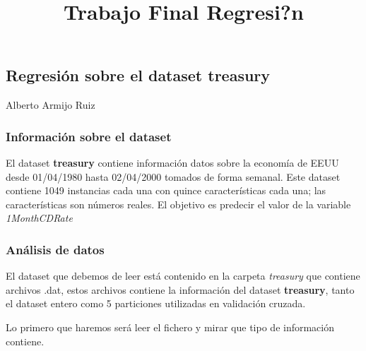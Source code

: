 \documentclass[11pt]{article}
\title{Trabajo Final Regresi?n}
\begin{document}
    
    
    \maketitle
    
    

    
    \hypertarget{regresiuxf3n-sobre-el-dataset-treasury}{%
\subsection{Regresión sobre el dataset
treasury}\label{regresiuxf3n-sobre-el-dataset-treasury}}

Alberto Armijo Ruiz

    \hypertarget{informaciuxf3n-sobre-el-dataset}{%
\subsubsection{Información sobre el
dataset}\label{informaciuxf3n-sobre-el-dataset}}

El dataset \textbf{treasury} contiene información datos sobre la
economía de EEUU desde 01/04/1980 hasta 02/04/2000 tomados de forma
semanal. Este dataset contiene 1049 instancias cada una con quince
características cada una; las características son números reales. El
objetivo es predecir el valor de la variable \emph{1MonthCDRate}

    \hypertarget{anuxe1lisis-de-datos}{%
\subsubsection{Análisis de datos}\label{anuxe1lisis-de-datos}}

El dataset que debemos de leer está contenido en la carpeta
\emph{treasury} que contiene archivos .dat, estos archivos contiene la
información del dataset \textbf{treasury}, tanto el dataset entero como
5 particiones utilizadas en validación cruzada.

Lo primero que haremos será leer el fichero y mirar que tipo de
información contiene.
\end{document}

